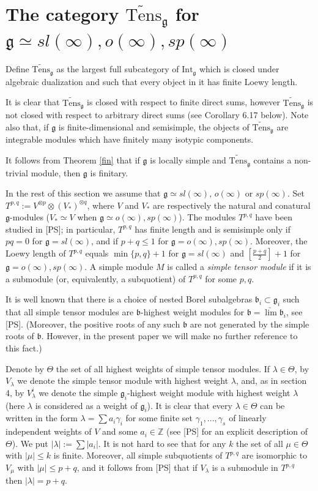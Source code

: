 \documentclass{birkmult}
\renewcommand{\gg}{\mathfrak{g}}
\newcommand{\bb}{\mathfrak{b}}
\newcommand{\Int}{\mathrm{Int}}
\newcommand{\lind}{\widetilde{\mathrm{Tens}}}
\begin{document}
\section{The category $\lind_\gg$ for $\gg\simeq sl(\infty), o(\infty), sp(\infty)$}

Define $\lind_\gg$ as the largest full subcategory of $\Int_\gg$
which is closed under algebraic dualization and such that every
object in it has finite Loewy length.

It is clear that $\lind_\gg$ is closed with respect to finite direct
sums, however $\lind_\gg$ is not closed with respect to arbitrary
direct sums (see Corollary 6.17 below). Note also that, if $\gg$
is finite-dimensional and semisimple, the objects of $\lind_\gg$
are integrable modules which have finitely many isotypic components.

It follows from Theorem \ref{fin} that if $\gg$ is locally simple
and $\lind_\gg$ contains a non-trivial module, then $\gg$ is
finitary. 

In the rest of this section we assume that $\gg\simeq sl(\infty),\,
o(\infty)$ or $sp(\infty)$.
Set $T^{p,q}:=V^{\otimes p}\otimes (V_*)^{\otimes q}$, where $V$ and
$V_*$ are respectively the natural and conatural $\gg$-modules
($V_*\simeq V$ when $\gg\simeq o(\infty), sp(\infty)$).
The modules $T^{p,q}$ have been studied in [PS]; in particular,
$T^{p,q}$ has finite length and is semisimple only if $pq=0$ for
  $\gg=sl(\infty)$, and if $p+q\leq 1$ for $\gg=o(\infty), sp(\infty)$.
Moreover, the Loewy length of
  $T^{p,q}$ equals $\min\{p,q\}+1$ for $\gg=sl(\infty)$ and
  $[\frac{p+q}{2}]+1$ for $\gg=o(\infty),sp(\infty)$.
A simple module $M$ is called a {\it simple tensor module} if it is a
  submodule (or, equivalently, a subquotient) of $T^{p,q}$
 for some $p,q$.

It is well known that there is a choice of nested Borel subalgebras
$\bb_i\subset\gg_i$ such that all simple tensor modules are $\bb$-highest
weight modules for $\bb=\underrightarrow{\lim}\bb_i$, see [PS]. (Moreover,
the positive roots of any such $\bb$ are not generated by the simple roots
of $\bb$. However, in the present paper we will make no further reference
to this fact.)

Denote by $\Theta$ the set of all highest weights of simple tensor
 modules. If $\lambda\in \Theta$, by $V_\lambda$ we denote the simple tensor module
 with highest weight $\lambda$, and, as in section 4, by $V_\lambda^i$ we denote the simple $\gg_i$-highest weight module with highest weight $\lambda$
 (here $\lambda$ is considered as a weight of $\gg_i$). It is clear that every $\lambda\in \Theta$ can be written in the form
 $\lambda=\sum a_i\gamma_i$ for some finite set
 $\gamma_1,...,\gamma_s$ of linearly independent weights of $V$ and some $a_i\in\mathbb{Z}$ (see [PS] for an explicit description of $\Theta$).
We put $|\lambda|:=\sum |a_i|$.
 It is not hard to see that for any $k$
the set of all $\mu \in \Theta$ with $|\mu|\leq k$ is
 finite. Moreover, all simple subquotients of
$T^{p,q}$ are isomorphic to $V_{\mu}$ with
$|\mu| \leq p+q$, and it follows from [PS] that if
 $V_\lambda$ is a submodule in $T^{p,q}$ then $|\lambda|=p+q$.
\end{document}
